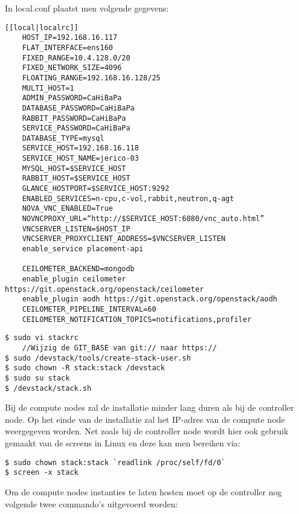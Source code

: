 \begin{appendices}
In local.conf plaatst men volgende gegevens:

\begin{code}
\begin{verbatim}
[[local|localrc]]
	HOST_IP=192.168.16.117
	FLAT_INTERFACE=ens160
	FIXED_RANGE=10.4.128.0/20
	FIXED_NETWORK_SIZE=4096
	FLOATING_RANGE=192.168.16.128/25
	MULTI_HOST=1
	ADMIN_PASSWORD=CaHiBaPa
	DATABASE_PASSWORD=CaHiBaPa
	RABBIT_PASSWORD=CaHiBaPa
	SERVICE_PASSWORD=CaHiBaPa
	DATABASE_TYPE=mysql
	SERVICE_HOST=192.168.16.118
	SERVICE_HOST_NAME=jerico-03
	MYSQL_HOST=$SERVICE_HOST
	RABBIT_HOST=$SERVICE_HOST
	GLANCE_HOSTPORT=$SERVICE_HOST:9292
	ENABLED_SERVICES=n-cpu,c-vol,rabbit,neutron,q-agt
	NOVA_VNC_ENABLED=True
	NOVNCPROXY_URL=“http://$SERVICE_HOST:6080/vnc_auto.html”
	VNCSERVER_LISTEN=$HOST_IP
	VNCSERVER_PROXYCLIENT_ADDRESS=$VNCSERVER_LISTEN
	enable_service placement-api

	CEILOMETER_BACKEND=mongodb
	enable_plugin ceilometer https://git.openstack.org/openstack/ceilometer
	enable_plugin aodh https://git.openstack.org/openstack/aodh
	CEILOMETER_PIPELINE_INTERVAL=60
	CEILOMETER_NOTIFICATION_TOPICS=notifications,profiler
\end{verbatim}
\end{code}

\begin{code}
\begin{verbatim}
$ sudo vi stackrc
	//Wijzig de GIT_BASE van git:// naar https://
$ sudo /devstack/tools/create-stack-user.sh
$ sudo chown -R stack:stack /devstack
$ sudo su stack
$ /devstack/stack.sh
\end{verbatim}
\end{code}

Bij de compute nodes zal de installatie minder lang duren als bij de controller node. Op het einde van de installatie zal het IP-adres van de compute node weergegeven worden. Net zoals bij de controller node wordt hier ook gebruik gemaakt van de screens in Linux en deze kan men bereiken via:

\begin{code}
\begin{verbatim}
$ sudo chown stack:stack `readlink /proc/self/fd/0`
$ screen -x stack
\end{verbatim}
\end{code}

Om de compute nodes instanties te laten hosten moet op de controller nog volgende twee commando's uitgevoerd worden:


\end{appendices}
